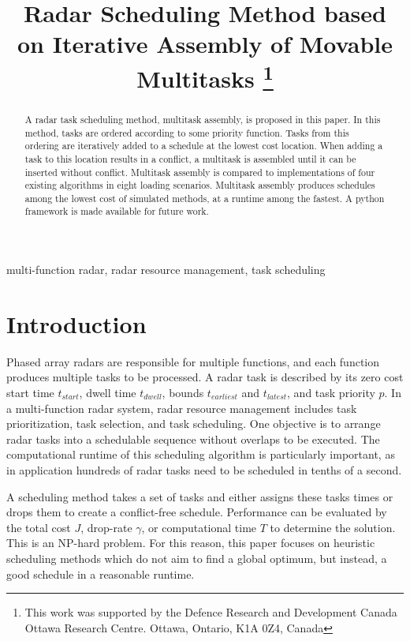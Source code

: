 \documentclass[conference]{IEEEtran}
\begin{document}
\title{Radar Scheduling Method based on Iterative Assembly of Movable Multitasks
	\thanks{This work was supported by the Defence Research and Development Canada Ottawa Research Centre. Ottawa, Ontario, K1A 0Z4, Canada}
}

\author{
}

\maketitle

\begin{abstract}
	A radar task scheduling method, multitask assembly, is proposed in this paper.
	In this method, tasks are ordered according to some priority function.
	Tasks from this ordering are iteratively added to a schedule at the lowest cost location.
	When adding a task to this location results in a conflict, a multitask is assembled until it can be inserted without conflict.
	Multitask assembly is compared to implementations of four existing algorithms in eight loading scenarios.
	Multitask assembly produces schedules among the lowest cost of simulated methods, at a runtime among the fastest.
	A python framework is made available for future work.
\end{abstract}

\begin{IEEEkeywords}
	multi-function radar, radar resource management, task scheduling
\end{IEEEkeywords}

\section{Introduction}

Phased array radars are responsible for multiple functions, and each function produces multiple tasks to be processed.
A radar task is described by its zero cost start time $t_{start}$, dwell time $t_{dwell}$, bounds $t_{earliest}$ and $t_{latest}$, and task priority $p$.
In a multi-function radar system, radar resource management includes task prioritization, task selection, and task scheduling.
One objective is to arrange radar tasks into a schedulable sequence without overlaps to be executed.
The computational runtime of this scheduling algorithm is particularly important, as in application hundreds of radar tasks need to be scheduled in tenths of a second.

A scheduling method takes a set of tasks and either assigns these tasks times or drops them to create a conflict-free schedule.
Performance can be evaluated by the total cost $J$, drop-rate $\gamma$, or computational time $T$ to determine the solution.
This is an NP-hard problem.
For this reason, this paper focuses on heuristic scheduling methods which do not aim to find a global optimum, but instead, a good schedule in a reasonable runtime.
\end{document}
